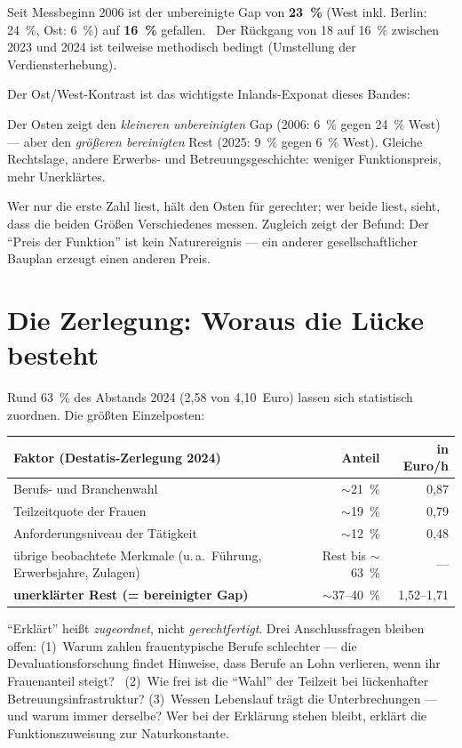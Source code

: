 Seit Messbeginn 2006 ist der unbereinigte Gap von \textbf{23~\%} (West inkl.
Berlin: 24~\%, Ost: 6~\%) auf \textbf{16~\%} gefallen. \belegt\ Der R\"uckgang
von 18 auf 16~\% zwischen 2023 und 2024 ist teilweise methodisch bedingt
(Umstellung der Verdiensterhebung). \plausibel

Der Ost/West-Kontrast ist das wichtigste Inlands-Exponat dieses Bandes:

\begin{datenbox}
Der Osten zeigt den \emph{kleineren unbereinigten} Gap (2006: 6~\% gegen 24~\%
West) --- aber den \emph{gr\"o\ss eren bereinigten} Rest (2025: 9~\% gegen 6~\%
West). Gleiche Rechtslage, andere Erwerbs- und Betreuungsgeschichte: weniger
Funktionspreis, mehr Unerkl\"artes. \belegt
\end{datenbox}

Wer nur die erste Zahl liest, h\"alt den Osten f\"ur gerechter; wer beide liest,
sieht, dass die beiden Gr\"o\ss en Verschiedenes messen. Zugleich zeigt der
Befund: Der \enquote{Preis der Funktion} ist kein Naturereignis --- ein anderer
gesellschaftlicher Bauplan erzeugt einen anderen Preis.

\section{Die Zerlegung: Woraus die L\"ucke besteht}

Rund 63~\% des Abstands 2024 (2,58 von 4,10~Euro) lassen sich statistisch
zuordnen. Die gr\"o\ss ten Einzelposten: \belegt

\begin{longtable}{@{}L{6.2cm}rr@{}}
\toprule
\textbf{Faktor (Destatis-Zerlegung 2024)} & \textbf{Anteil} & \textbf{in Euro/h} \\
\midrule
Berufs- und Branchenwahl & \(\sim\)21~\% & 0,87 \\
Teilzeitquote der Frauen & \(\sim\)19~\% & 0,79 \\
Anforderungsniveau der T\"atigkeit & \(\sim\)12~\% & 0,48 \\
\"ubrige beobachtete Merkmale (u.\,a.\ F\"uhrung, Erwerbsjahre, Zulagen) & Rest bis \(\sim\)63~\% & --- \\
\midrule
\textbf{unerkl\"arter Rest (= bereinigter Gap)} & \(\sim\)37--40~\% & 1,52--1,71 \\
\bottomrule
\end{longtable}

\begin{gegen}
\enquote{Erkl\"art} hei\ss t \emph{zugeordnet}, nicht \emph{gerechtfertigt}. Drei
Anschlussfragen bleiben offen: (1)~Warum zahlen frauentypische Berufe schlechter
--- die Devaluationsforschung findet Hinweise, dass Berufe an Lohn verlieren,
wenn ihr Frauenanteil steigt? \umstritten\ (2)~Wie frei ist die
\enquote{Wahl} der Teilzeit bei l\"uckenhafter Betreuungsinfrastruktur?
(3)~Wessen Lebenslauf tr\"agt die Unterbrechungen --- und warum immer derselbe?
Wer bei der Erkl\"arung stehen bleibt, erkl\"art die Funktionszuweisung zur
Naturkonstante.
\end{gegen}

